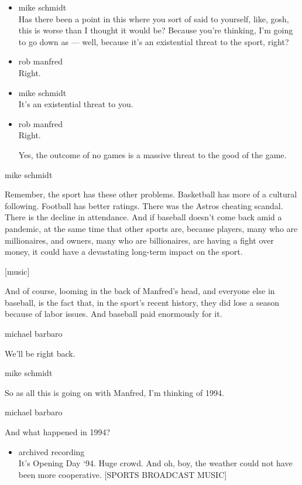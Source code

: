 \begin{itemize}
\item
  mike schmidt\\
  Has there been a point in this where you sort of said to yourself,
  like, gosh, this is worse than I thought it would be? Because you're
  thinking, I'm going to go down as --- well, because it's an
  existential threat to the sport, right?
\item
  rob manfred\\
  Right.
\item
  mike schmidt\\
  It's an existential threat to you.
\item
  rob manfred\\
  Right.

  Yes, the outcome of no games is a massive threat to the good of the
  game.
\end{itemize}

mike schmidt

Remember, the sport has these other problems. Basketball has more of a
cultural following. Football has better ratings. There was the Astros
cheating scandal. There is the decline in attendance. And if baseball
doesn't come back amid a pandemic, at the same time that other sports
are, because players, many who are millionaires, and owners, many who
are billionaires, are having a fight over money, it could have a
devastating long-term impact on the sport.

{[}music{]}

And of course, looming in the back of Manfred's head, and everyone else
in baseball, is the fact that, in the sport's recent history, they did
lose a season because of labor issues. And baseball paid enormously for
it.

michael barbaro

We'll be right back.

mike schmidt

So as all this is going on with Manfred, I'm thinking of 1994.

michael barbaro

And what happened in 1994?

\begin{itemize}
\tightlist
\item
  archived recording\\
  It's Opening Day `94. Huge crowd. And oh, boy, the weather could not
  have been more cooperative. {[}SPORTS BROADCAST MUSIC{]}
\end{itemize}

